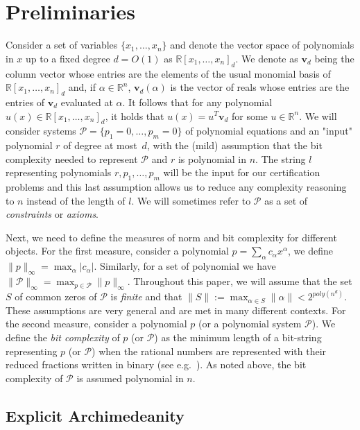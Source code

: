 \documentclass[11pt]{article}
\begin{document}
\section{Preliminaries}\label{sect:prelim}
Consider a set of variables $\{x_1,\ldots,x_n\}$ and denote the vector space of polynomials in $x$ up to a fixed degree $d = O(1)$ as $\mathbb{R}[x_1, \dots, x_n]_d$. We denote as $\mathbf{v}_d$ being the column vector whose entries are the elements of the usual monomial basis of $\mathbb{R}[x_1, \dots, x_n]_d$ and, if $\alpha \in \mathbb{R}^n$, $\mathbf{v}_d(\alpha)$ is the vector of reals whose entries are the entries of $\mathbf{v}_d$ evaluated at $\alpha$. It follows that for any polynomial $u(x) \in \mathbb{R}[x_1, \dots, x_n]_d$, it holds that $u(x) = u^{T} \mathbf{v}_d$ for some $u \in \mathbb{R}^n$. 
We will consider systems $\mathcal{P} = \{p_1 = 0,\ldots,p_m = 0\}$ of polynomial equations and an "input" polynomial $r$ of degree at most~$d$, with the (mild) assumption that the bit complexity needed to represent $\mathcal{P}$ and $r$ is polynomial in $n$. The string $l$ representing polynomials $r, p_1, \dots, p_m$ will be the input for our certification problems and this last assumption allows us to reduce any complexity reasoning to $n$ instead of the length of $l$. We will sometimes refer to $\mathcal{P}$ as a set of \emph{constraints} or \emph{axioms}.

Next, we need to define the measures of norm and bit complexity for different objects. For the first measure, consider a polynomial $p = \sum_\alpha c_\alpha x^\alpha$, we define $\| p \|_{\infty} = \max_\alpha |c_{\alpha}|$. Similarly, for a set of polynomial we have $\| \mathcal{P} \|_{\infty} = \max_{p \in \mathcal{P}} \| p \|_{\infty}$. Throughout this paper, we will assume that the set $S$ of common zeros of $\mathcal P$ is \textit{finite} and that  $\| S \| := \max_{\alpha \in S} \| \alpha \| < 2^{poly(n^d)}$. These assumptions are very general and are met in many different contexts. For the second measure, consider a polynomial $p$ (or a polynomial system $\mathcal{P}$). We define the \emph{bit complexity} of $p$ (or $\mathcal{P}$) as the minimum length of a bit-string representing $p$ (or $\mathcal{P}$) when the rational numbers are represented with their reduced fractions written in binary (see e.g.~\cite{Hakoniemi21}). As noted above, the bit complexity of $\mathcal{P}$ is assumed polynomial in $n$.

\subsection*{Explicit Archimedeanity}
\end{document}
